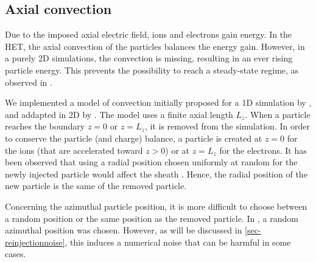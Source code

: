 \subsection{Axial convection}

Due to the imposed axial electric field, ions and electrons gain energy.
In the \ac{HET}, the axial convection of the particles balances the energy gain.
However, in a purely \ac{2D} simulations, the convection is missing, resulting in an ever rising particle energy.
This prevents the possibility to reach a steady-state regime, as observed in \citet{heron2013,janhunen2018}.

We implemented a model of convection initially proposed for a \ac{1D} simulation by \citet{lafleur2016a}, and addapted in \ac{2D} by \citet{croes2017a}.
The model uses a finite axial length $L_z$.
When a particle reaches the boundary $z=0$ or $z=L_z$, it is removed from the simulation.
In order to conserve the particle (and charge) balance, a particle is created at $z=0$ for the ions (that are accelerated toward $z>0$) or at $z=L_z$ for the electrons.
It has been observed that using a radial position chosen uniformly at random for the newly injected particle would affect the sheath \citep{croes2017a}.
Hence, the radial position of the new particle is the same of the removed particle.

Concerning the azimuthal particle position, it is more difficult to choose between a random position or the same position as the removed particle.
In \citet{lafleur2016a,croes2017a}, a random azimuthal position was chosen.
However, as will be discussed in \cref{sec-reinjectionnoise}, this induces a numerical noise that can be harmful in some cases.
